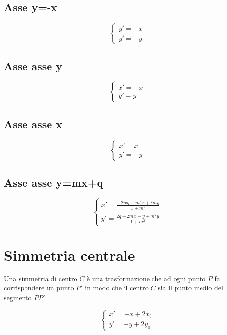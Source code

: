 \subsection{Asse y=-x}
\begin{tcolorbox}[sidebyside,righthand width=7cm,colback=white,colframe=white,fonttitle=\bfseries	]
	\[\begin{cases}
	y'=-x\\
	y'=-y
	\end{cases}
	\]
	\tcblower
	
\end{tcolorbox}
\subsection{Asse asse y}
\begin{tcolorbox}[sidebyside,righthand width=7cm,colback=white,colframe=white,fonttitle=\bfseries	]
	\[\begin{cases}
	x'=-x\\
	y'=y
	\end{cases}
	\]
	\tcblower
		
\end{tcolorbox}
\subsection{Asse asse x}
\begin{tcolorbox}[sidebyside,righthand width=7cm,colback=white,colframe=white,fonttitle=\bfseries	]
	\[\begin{cases}
	x'=x\\
	y'=-y
	\end{cases}
	\]
	\tcblower
	
\end{tcolorbox}
\subsection{Asse asse y=mx+q}
\begin{tcolorbox}[sidebyside,righthand width=7cm,colback=white,colframe=white,fonttitle=\bfseries	]
	\[\begin{cases}
	x'=\frac{-2mq-m^2x+2my}{1+m^2}\\
	y'=\frac{2q+2mx-y+m^2y}{1+m^2}
	\end{cases}
	\]
	\tcblower
	
\end{tcolorbox}
\section{Simmetria centrale}
Una simmetria di centro $C$ è una trasformazione che ad ogni punto $P$ fa corrispondere un punto $P'$ in modo che il centro $C$ sia il punto medio del segmento $PP'$.
\begin{tcolorbox}[sidebyside,righthand width=7cm,colback=white,colframe=white,fonttitle=\bfseries	]
	\[\begin{cases}
	x'=-x+2x_0\\
	y'=-y+2y_0
	\end{cases}
	\]
	\tcblower
	
\end{tcolorbox}
